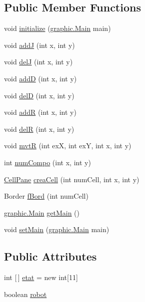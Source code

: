 \subsection*{Public Member Functions}
\begin{DoxyCompactItemize}
\item 
void \hyperlink{classgraphic_1_1_grid_panel_a3ac9e3dc1d58bee96e2d8c93582542f8}{initialize} (\hyperlink{classgraphic_1_1_main}{graphic.\+Main} main)
\item 
void \hyperlink{classgraphic_1_1_grid_panel_a45010afc7fdcbcd0a4793c9d1e3b9130}{addJ} (int x, int y)
\item 
void \hyperlink{classgraphic_1_1_grid_panel_add084a73d4c1597c56ee83c177c84ea8}{delJ} (int x, int y)
\item 
void \hyperlink{classgraphic_1_1_grid_panel_ac875580b8be1c0b3f2c895352a48a70b}{addD} (int x, int y)
\item 
void \hyperlink{classgraphic_1_1_grid_panel_a8443ee0249f33bbf63bcc45736096a13}{delD} (int x, int y)
\item 
void \hyperlink{classgraphic_1_1_grid_panel_ab1010c154b3bdf06ef05fdd37e18b7bb}{addR} (int x, int y)
\item 
void \hyperlink{classgraphic_1_1_grid_panel_ad114a8a30536087a1dfa6c0df00cdc69}{delR} (int x, int y)
\item 
void \hyperlink{classgraphic_1_1_grid_panel_a0f8dbc4fcd8aa46debd567bccde7abec}{mvtR} (int exX, int exY, int x, int y)
\item 
int \hyperlink{classgraphic_1_1_grid_panel_a76a411ada1cd50f1a9923b55b366c800}{num\+Compo} (int x, int y)
\item 
\hyperlink{classgraphic_1_1_cell_pane}{Cell\+Pane} \hyperlink{classgraphic_1_1_grid_panel_a541bf9099ceafbd082dd5c986af1cadf}{crea\+Cell} (int num\+Cell, int x, int y)
\item 
Border \hyperlink{classgraphic_1_1_grid_panel_ad1d3cae8c7aef1a90c84c74daa07ede3}{f\+Bord} (int num\+Cell)
\item 
\hyperlink{classgraphic_1_1_main}{graphic.\+Main} \hyperlink{classgraphic_1_1_grid_panel_aef759da0374166debd9b42682d17ff5f}{get\+Main} ()
\item 
void \hyperlink{classgraphic_1_1_grid_panel_ac4091164ae46504588cbeb9f22430de0}{set\+Main} (\hyperlink{classgraphic_1_1_main}{graphic.\+Main} main)
\end{DoxyCompactItemize}
\subsection*{Public Attributes}
\begin{DoxyCompactItemize}
\item 
int \mbox{[}$\,$\mbox{]} \hyperlink{classgraphic_1_1_grid_panel_a03acd6ba4608c434fead05a4c37d170a}{etat} = new int\mbox{[}11\mbox{]}
\item 
boolean \hyperlink{classgraphic_1_1_grid_panel_a6c9676cf3ad0b634aea1c48b745d5046}{robot}
\end{DoxyCompactItemize}


